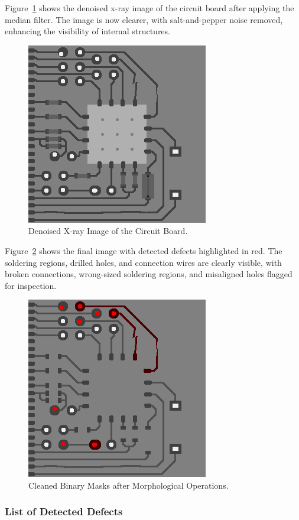\documentclass[a4paper,12pt]{article}
\begin{document}
Figure~\ref{fig:image_denoised} shows the denoised x-ray image of the circuit board after applying the median filter. The image is now clearer, with salt-and-pepper noise removed, enhancing the visibility of internal structures.

\begin{figure}[!htbp]
    \centering
    \includegraphics[width=0.5\linewidth]{data/output/circuit_board_qa/image_denoised.png}
    \caption{Denoised X-ray Image of the Circuit Board.}
    \label{fig:image_denoised}
\end{figure}

Figure~\ref{fig:final_image} shows the final image with detected defects highlighted in red. The soldering regions, drilled holes, and connection wires are clearly visible, with broken connections, wrong-sized soldering regions, and misaligned holes flagged for inspection.

\begin{figure}[!htbp]
    \centering
    \includegraphics[width=0.5\linewidth]{data/output/circuit_board_qa/final_image.png}
    \caption{Cleaned Binary Masks after Morphological Operations.}
    \label{fig:final_image}
\end{figure}

\subsubsection{List of Detected Defects}
\end{document}
